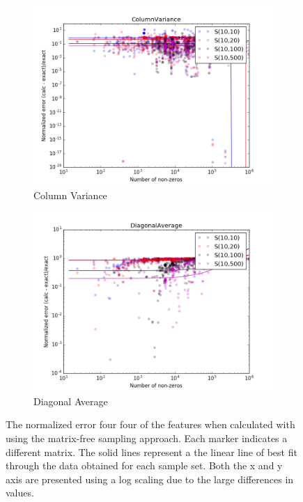 \begin{figure}[h]
\begin{subfigure}{0.475\textwidth}
     \includegraphics[width=\textwidth]{figures/figure3.png}
     \caption{Column Variance}
     \label{accuracy2}
     \end{subfigure}
     \hfill
     \begin{subfigure}{0.475\textwidth}
     \centering 
     \includegraphics[width=\textwidth]{figures/figure4.png}
     \caption{Diagonal Average}
     \label{accuracy3}
     \end{subfigure}
     \caption{ The normalized error four four of the features when calculated with using the matrix-free sampling approach. Each marker indicates a different matrix. The solid lines represent a the linear line of best fit through the data obtained for each sample set. Both the x and y axis are presented using a log scaling due to the large differences in values. }
\end{figure}

